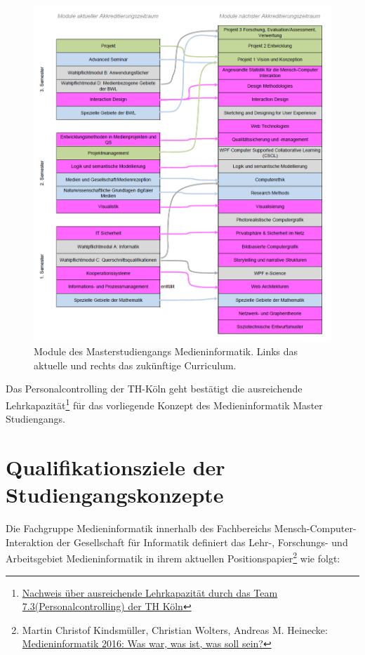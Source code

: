 \begin{figure}[htbp]
\centering
\includegraphics[width=\columnwidth]{../anhaenge/bilder/ma-mpo3-mpo4.png}
\caption{Module des Masterstudiengangs Medieninformatik. Links das
aktuelle und rechts das zukünftige Curriculum.}
\end{figure}

Das Personalcontrolling der TH-Köln geht bestätigt die ausreichende
Lehrkapazität\footnote{\href{https://th-koeln.github.io/mi-2017/anhaenge/th-verwaltung-kapa-nachweis.pdf}{Nachweis
  über ausreichende Lehrkapazität durch das Team
  7.3(Personalcontrolling) der TH Köln}} für das vorliegende Konzept des
Medieninformatik Master Studiengangs.

\chapter{Qualifikationsziele der
Studiengangskonzepte}\label{qualifikationsziele-der-studiengangskonzepte}

Die Fachgruppe Medieninformatik innerhalb des Fachbereichs
Mensch-Computer-Interaktion der Gesellschaft für Informatik definiert
das Lehr-, Forschungs- und Arbeitsgebiet Medieninformatik in ihrem
aktuellen Positionspapier\footnote{Martin Christof Kindsmüller,
  Christian Wolters, Andreas M. Heinecke:
  \href{http://dl.mensch-und-computer.de/bitstream/handle/123456789/5131/Kindsm\%C3\%BCller_Wolters_Heinecke_2016.pdf}{Medieninformatik
  2016: Was war, was ist, was soll sein?}} wie folgt:

